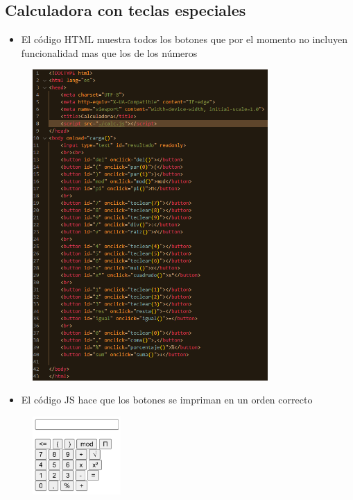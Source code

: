 \documentclass{article}
\begin{document}
	\subsection{Calculadora con teclas especiales}
	\begin{itemize}	
		\item El código HTML muestra todos los botones que por el momento no incluyen funcionalidad
		mas que los de los números
	\end{itemize}
	\begin{figure}[H]
		\centering
		\includegraphics[width=0.8\textwidth,keepaspectratio]{src/e1/calc01.png}
	\end{figure}
	\begin{itemize}	
		\item El código JS hace que los botones se impriman en un orden correcto
	\end{itemize}
	
	\begin{figure}[H]
		\centering
		\includegraphics[width=0.3\textwidth,keepaspectratio]{img/calc01.png}
	\end{figure}
\end{document}
